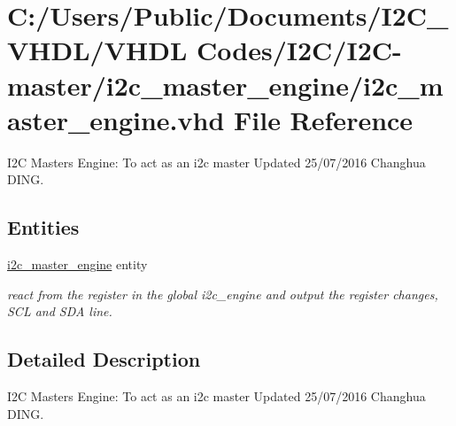 \hypertarget{i2c__master__engine_8vhd}{}\section{C\+:/\+Users/\+Public/\+Documents/\+I2\+C\+\_\+\+V\+H\+D\+L/\+V\+H\+DL Codes/\+I2\+C/\+I2\+C-\/master/i2c\+\_\+master\+\_\+engine/i2c\+\_\+master\+\_\+engine.vhd File Reference}
\label{i2c__master__engine_8vhd}


I2C Master\textquotesingle{}s Engine\+: To act as an i2c master Updated 25/07/2016 Changhua D\+I\+NG.  


\subsection*{Entities}
\begin{DoxyCompactItemize}
\item 
\hyperlink{classi2c__master__engine}{i2c\+\_\+master\+\_\+engine} entity
\begin{DoxyCompactList}\small\item\em react from the register in the global i2c\+\_\+engine and output the register changes, S\+CL and S\+DA line. \end{DoxyCompactList}\end{DoxyCompactItemize}


\subsection{Detailed Description}
I2C Master\textquotesingle{}s Engine\+: To act as an i2c master Updated 25/07/2016 Changhua D\+I\+NG. 

